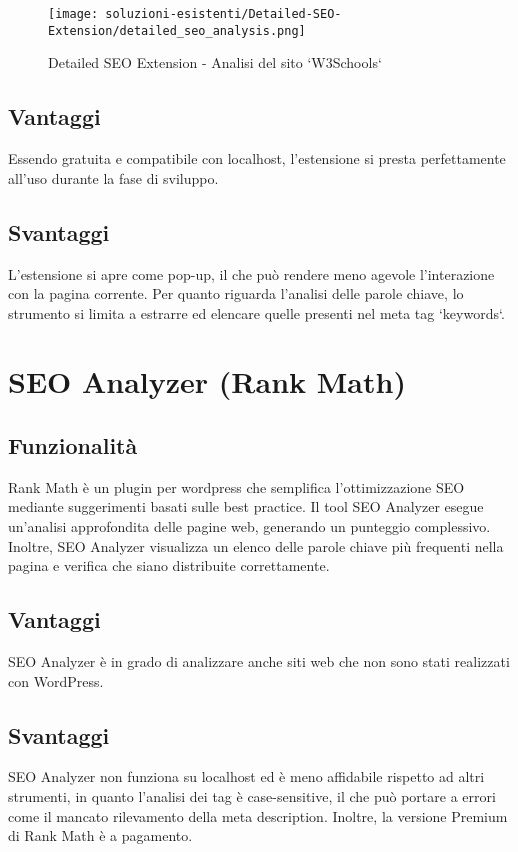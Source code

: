 \begin{figure}[H]
    \centering 
    \texttt{[image: soluzioni-esistenti/Detailed-SEO-Extension/detailed\_seo\_analysis.png]} 
    \caption{Detailed SEO Extension - Analisi del sito `W3Schools`}
\end{figure}

\subsection{Vantaggi}
\par Essendo gratuita e compatibile con \gls{localhost}, l'estensione si presta perfettamente all'uso durante la fase di sviluppo.

\subsection{Svantaggi}
\par L'estensione si apre come pop-up, il che può rendere meno agevole l'interazione con la pagina corrente. Per quanto riguarda l'analisi delle parole chiave, lo strumento si limita a estrarre ed elencare quelle presenti nel meta tag `keywords`.

\section{SEO Analyzer (Rank Math)}

\subsection{Funzionalità}
\par Rank Math è un plugin per \gls{wordpress} che semplifica l'ottimizzazione SEO mediante suggerimenti basati sulle best practice. Il tool SEO Analyzer esegue un'analisi approfondita delle pagine web, generando un punteggio complessivo. Inoltre, SEO Analyzer visualizza un elenco delle parole chiave più frequenti nella pagina e verifica che siano distribuite correttamente.

\subsection{Vantaggi}
\par SEO Analyzer è in grado di analizzare anche siti web che non sono stati realizzati con WordPress.

\subsection{Svantaggi}
\par SEO Analyzer non funziona su \gls{localhost} ed è meno affidabile rispetto ad altri strumenti, in quanto l'analisi dei tag è \gls{case-sensitive}, il che può portare a errori come il mancato rilevamento della meta description. Inoltre, la versione Premium di Rank Math è a pagamento.

